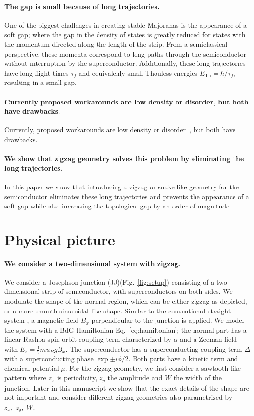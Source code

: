\documentclass[english, twocolumn, 10pt, aps, superscriptaddress, floatfix, prb, citeautoscript]{revtex4-1}
\renewcommand{\comment}[2]{#2}
\renewcommand{\comment}{\paragraph}
\begin{document}
\comment{The gap is small because of long trajectories.}
One of the biggest challenges in creating stable Majoranas is the appearance of a soft gap; where the gap in the density of states is greatly reduced for states with the momentum directed along the length of the strip.
From a semiclassical perspective, these momenta correspond to long paths through the semiconductor without interruption by the superconductor.
Additionally, these long trajectories have long flight times $\tau_f$ and equivalenly small Thouless energies $E_{\textrm{Th}}=\hbar / \tau_f$, resulting in a small gap. 

\comment{Currently proposed workarounds are low density or disorder, but both have drawbacks.}
Currently, proposed workarounds are low density or disorder~\cite{haim_double-edge_2018}, but both have drawbacks.

\comment{We show that zigzag geometry solves this problem by eliminating the long trajectories.}
In this paper we show that introducing a zigzag or snake like geometry for the semiconductor eliminates these long trajectories and prevents the appearance of a soft gap while also increasing the topological gap by an order of magnitude.


\section{Physical picture}
\comment{We consider a two-dimensional system with zigzag.}
We consider a Josephson junction (JJ)(Fig.~\ref{fig:setup}) consisting of a two dimensional strip of semiconductor, with superconductors on both sides.
We modulate the shape of the normal region, which can be either zigzag as depicted, or a more smooth sinusoidal like shape.
Similar to the conventional straight system \cite{pientka2017topological}, a magnetic field $B_x$ perpendicular to the junction is applied.
We model the system with a BdG Hamiltonian Eq.~\eqref{eq:hamiltonian}; the normal part has a linear Rashba spin-orbit coupling term characterized by $\alpha$ and a Zeeman field with $E_z=\frac{1}{2}mu_B g B_x$.
The superconductor has a superconducting coupling term $\Delta$ with a superconducting phase $\exp{\pm i \phi/2}$.
Both parts have a kinetic term and chemical potential $\mu$. 
For the zigzag geometry, we first consider a sawtooth like pattern where $z_x$ is periodicity, $z_y$ the amplitude and $W$ the width of the junction.
Later in this manuscript we show that the exact details of the shape are not important and consider different zigzag geometries also parametrized by $z_x, \; z_y, \; W$.
\end{document}
